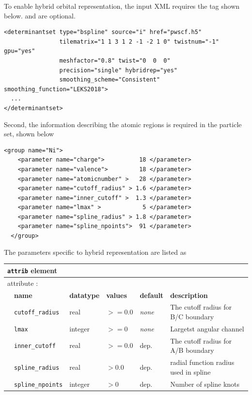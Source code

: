 To enable hybrid orbital representation, the input XML requires the tag  shown below.
 and  are optional.
\begin{lstlisting}[style=QMCPXML,caption=Hybrid orbital representation input example.\label{listing:hybridrep}]
<determinantset type="bspline" source="i" href="pwscf.h5"
                tilematrix="1 1 3 1 2 -1 -2 1 0" twistnum="-1" gpu="yes"
                meshfactor="0.8" twist="0  0  0"
                precision="single" hybridrep="yes"
                smoothing_scheme="Consistent" smoothing_function="LEKS2018">
  ...
</determinantset>
\end{lstlisting}
Second, the information describing the atomic regions is required in the particle set, shown below
\begin{lstlisting}[style=QMCPXML,caption=particleset elements for ions with information needed by hybrid orbital representation.\label{listing:hybridrep_particleset}]
  <group name="Ni">
    <parameter name="charge">          18 </parameter>
    <parameter name="valence">         18 </parameter>
    <parameter name="atomicnumber" >   28 </parameter>
    <parameter name="cutoff_radius" > 1.6 </parameter>
    <parameter name="inner_cutoff" >  1.3 </parameter>
    <parameter name="lmax" >            5 </parameter>
    <parameter name="spline_radius" > 1.8 </parameter>
    <parameter name="spline_npoints">  91 </parameter>
  </group>
\end{lstlisting}

The parameters specific to hybrid representation are listed as
\begin{table}[h]
\centering
\begin{tabularx}{\textwidth}{l l l l l l }
\hline
\multicolumn{6}{l}{\texttt{attrib} element} \\
\hline
\multicolumn{2}{l}{attribute      :} & \multicolumn{4}{l}{}\\
   &   \bfseries name            & \bfseries datatype & \bfseries values & \bfseries default   & \bfseries description \\
   &   \texttt{cutoff\_radius}             &  real            &  $>=0.0$    &  \textit{none}    & The cutoff radius for B/C boundary  \\
   &   \texttt{lmax}         &  integer            &  $>=0$ &  \textit{none} & Largetst angular channel \\
   &   \texttt{inner\_cutoff}             &  real            &  $>=0.0$    &  dep.    & The cutoff radius for A/B boundary  \\
   &   \texttt{spline\_radius}         &  real            &  $>0.0$ &  dep. & radial function radius used in spline \\
   &   \texttt{spline\_npoints}         &  integer            &  $>0$ &  dep. & Number of spline knots \\
  \hline
\end{tabularx}
\end{table}

